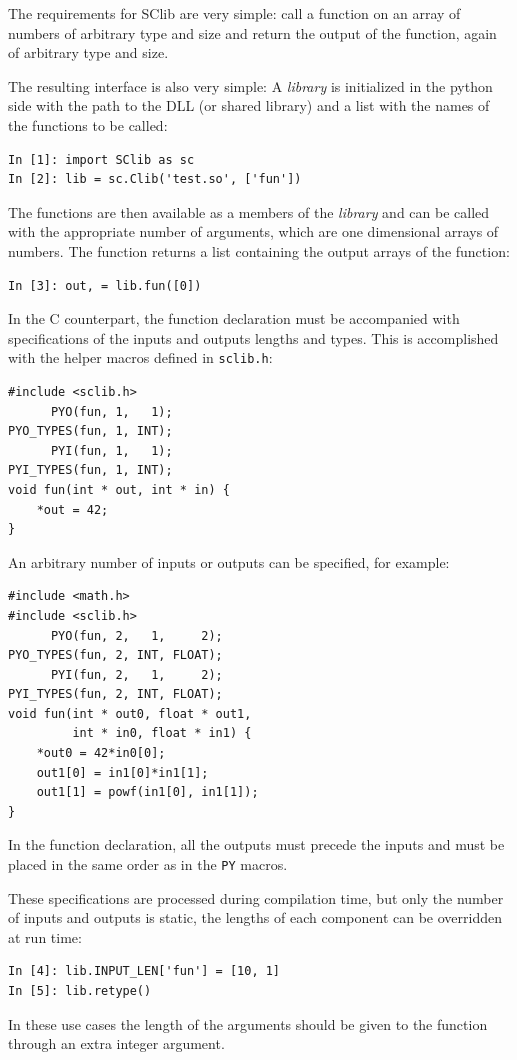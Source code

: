 \documentclass[10pt, a4paper, twocolumn]{article}
\begin{document}
The requirements for SClib are very simple: call a function on an array of
numbers of arbitrary type and size and return the output of the function, again
of arbitrary type and size.

The resulting interface is also very simple: A \emph{library} is initialized
in the python side with the path to the DLL (or shared library) and a list with
the names of the functions to be called:
\begin{verbatim}
In [1]: import SClib as sc
In [2]: lib = sc.Clib('test.so', ['fun'])
\end{verbatim}
The functions are then available as a members of the \emph{library} and can be
called with the appropriate number of arguments, which are one dimensional
arrays of numbers.  The function returns a list containing the output arrays of
the function:
\begin{verbatim}
In [3]: out, = lib.fun([0])
\end{verbatim}
In the C counterpart, the function declaration must be accompanied with
specifications of the inputs and outputs lengths and types. This is accomplished
with the helper macros defined in \verb+sclib.h+:
\begin{verbatim}
#include <sclib.h>
      PYO(fun, 1,   1);
PYO_TYPES(fun, 1, INT);
      PYI(fun, 1,   1);
PYI_TYPES(fun, 1, INT);
void fun(int * out, int * in) {
    *out = 42;
}\end{verbatim}
An arbitrary number of inputs or outputs can be specified, for example:
\begin{verbatim}
#include <math.h>
#include <sclib.h>
      PYO(fun, 2,   1,     2);
PYO_TYPES(fun, 2, INT, FLOAT);
      PYI(fun, 2,   1,     2);
PYI_TYPES(fun, 2, INT, FLOAT);
void fun(int * out0, float * out1,
         int * in0, float * in1) {
    *out0 = 42*in0[0];
    out1[0] = in1[0]*in1[1];
    out1[1] = powf(in1[0], in1[1]);
}\end{verbatim}
In the function declaration, all the outputs must precede the inputs and must be
placed in the same order as in the \verb+PY+ macros.

These specifications are processed during compilation time, but only the number
of inputs and outputs is static, the lengths of each component can be overridden
at run time:
\begin{verbatim}
In [4]: lib.INPUT_LEN['fun'] = [10, 1]
In [5]: lib.retype()
\end{verbatim}
In these use cases the length of the arguments should be given to the function
through an extra integer argument.
\end{document}
